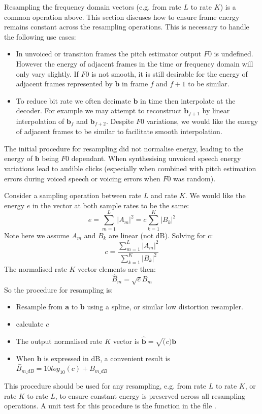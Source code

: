 \documentclass{article}
\begin{document}
Resampling the frequency domain vectors (e.g. from rate $L$ to rate $K$) is a common operation above.  This section discuses how to ensure frame energy remains constant across the resampling operations.  This is necessary to handle the following use cases:
\begin{itemize}
\item In unvoiced or transition frames the pitch estimator output $F0$ is undefined. However the energy of adjacent frames in the time or frequency domain will only vary slightly. If $F0$ is not smooth, it is still desirable for the energy of adjacent frames represented by $\mathbf{b}$ in frame $f$ and $f+1$ to be similar.
\item To reduce bit rate we often decimate $\mathbf{b}$ in time then interpolate at the decoder.  For example we may attempt to reconstruct $\mathbf{b}_{f+1}$ by linear interpolation of $\mathbf{b}_{f}$ and $\mathbf{b}_{f+2}$. Despite $F0$ variations, we would like the energy of adjacent frames to be similar to facilitate smooth interpolation.
\end{itemize}
The initial procedure for resampling did not normalise energy, leading to the energy of $\mathbf{b}$ being $F0$ dependant.  When synthesising unvoiced speech energy variations lead to audible clicks (especially when combined with pitch estimation errors during voiced speech or voicing errors when $F0$ was random).

Consider a sampling operation between rate $L$ and rate $K$.  We would like the energy $e$ in the vector at both sample rates to be the same:
\begin{equation}
e = \sum_{m=1}^L | A_m |^2 = c \sum_{k=1}^K | B_k |^2 
\end{equation}
Note here we assume $A_m$ and $B_k$ are linear (not dB). Solving for c:
\begin{equation}
c = \frac{\sum_{m=1}^L | A_m |^2}{\sum_{k=1}^K | B_k |^2} 
\end{equation}
The normalised rate $K$ vector elements are then:
\begin{equation}
\hat{B}_m = \sqrt{c}B_m
\end{equation}
So the procedure for resampling is:
\begin{itemize}
\item Resample from $\mathbf{a}$ to $\mathbf{b}$ using a spline, or similar low distortion resampler.
\item calculate $c$
\item The output normalised rate $K$ vector is $\hat{\mathbf{b}}=\sqrt(c)\mathbf{b}$
\item When $\mathbf{b}$ is expressed in dB, a convenient result is $\hat{B}_{m\_dB} = 10log_{10}(c)+B_{m\_dB}$
\end{itemize}
This procedure should be used for any resampling, e.g. from rate $L$ to rate $K$, or rate $K$ to rate $L$, to ensure constant energy is preserved across all resampling operations.  A unit test for this procedure is the function  in the file .
\end{document}
